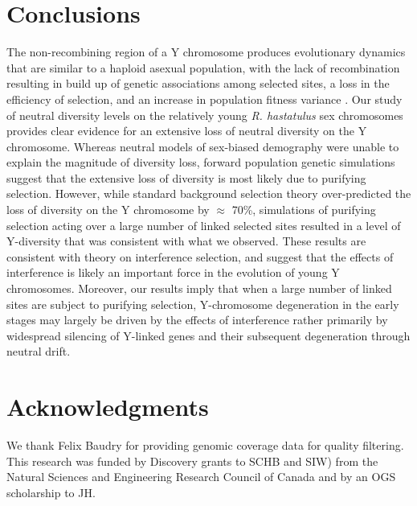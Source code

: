 \documentclass[9pt,twocolumn,twoside]{gsajnl}
\begin{document}
\section*{Conclusions}
The non-recombining region of a Y chromosome produces evolutionary dynamics that are similar to a haploid asexual population, with the lack of recombination resulting in build up of genetic associations among selected sites, a loss in the efficiency of selection, and an increase in population fitness variance \citep{fisher1930genetical, muller1964relation, hill1966HReffect, mcvean2000,KaiserCharlesworth,good2014genetic}. Our study of neutral diversity levels on the relatively young \textit{R. hastatulus} sex chromosomes provides clear evidence for an extensive loss of neutral diversity on the Y chromosome. Whereas neutral models of sex-biased demography were unable to explain the magnitude of diversity loss, forward population genetic simulations suggest that the extensive loss of diversity is most likely due to purifying selection. However, while standard background selection theory over-predicted the loss of diversity on the Y chromosome by $\approx$ 70\%, simulations of purifying selection acting over a large number of linked selected sites resulted in a level of Y-diversity that was consistent with what we observed. These results are consistent with theory on interference selection, and suggest that the effects of interference is likely an important force in the evolution of young Y chromosomes. Moreover, our results imply that when a large number of linked sites are subject to purifying selection, Y-chromosome degeneration in the early stages may largely be driven by the effects of interference rather primarily by widespread silencing of Y-linked genes and their subsequent degeneration through neutral drift.

\section*{Acknowledgments}
We thank Felix Baudry for providing genomic coverage data for quality filtering. This research was funded by Discovery grants to SCHB and SIW) from the Natural Sciences and Engineering Research Council of Canada and by an OGS scholarship to JH.





\end{document}

